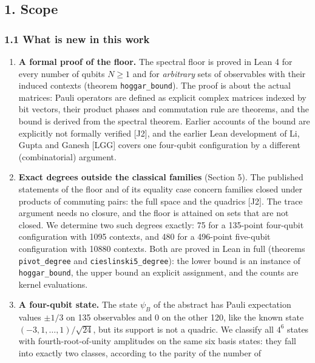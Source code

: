 \documentclass[11pt,a4paper]{article}
\providecommand{\tightlist}{\setlength{\itemsep}{0pt}\setlength{\parskip}{0pt}}
\begin{document}
\subsection{1. Scope}\label{1-scope}

\subsubsection{1.1 What is new in this work}\label{11-what-is-new-in-this-work}

\begin{enumerate}
\def\labelenumi{\arabic{enumi}.}
\tightlist
\item
  \textbf{A formal proof of the floor.} The spectral floor is proved in Lean 4 for every number of qubits
  \(N \ge 1\) and for \emph{arbitrary} sets of observables with their induced contexts (theorem
  \texttt{hoggar\_bound}). The proof is about the actual matrices: Pauli operators are defined as explicit
  complex matrices indexed by bit vectors, their product phases and commutation rule are theorems, and
  the bound is derived from the spectral theorem. Earlier accounts of the bound are explicitly not
  formally verified {[}J2{]}, and the earlier Lean development of Li, Gupta and Ganesh {[}LGG{]} covers one
  four-qubit configuration by a different (combinatorial) argument.
\item
  \textbf{Exact degrees outside the classical families} (Section 5). The published statements of the floor
  and of its equality case concern families closed under products of commuting pairs: the full space
  and the quadrics {[}J2{]}. The trace argument needs no closure, and the floor is attained on sets that are
  not closed. We determine two such degrees exactly: 75 for a 135-point four-qubit configuration with
  1095 contexts, and 480 for a 496-point five-qubit configuration with 10880 contexts. Both are
  proved in Lean in full (theorems \texttt{pivot\_degree} and \texttt{cieslinski5\_degree}): the lower bound is an
  instance of \texttt{hoggar\_bound}, the upper bound an explicit assignment, and the counts are kernel
  evaluations.
\item
  \textbf{A four-qubit state.} The state \(\psi_B\) of the abstract has Pauli expectation values \(\pm 1/3\) on
  135 observables and \(0\) on the other 120, like the known state \((-3,1,\dots,1)/\sqrt{24}\), but its
  support is not a quadric. We classify all \(4^6\) states with fourth-root-of-unity amplitudes on the
  same six basis states: they fall into exactly two classes, according to the parity of the number of

\end{enumerate}
\end{document}
